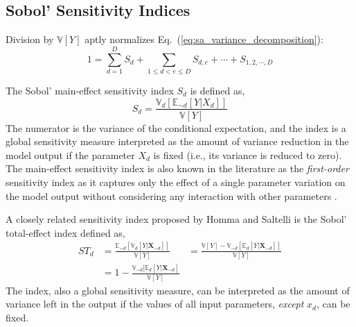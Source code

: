 \subsection{Sobol' Sensitivity Indices}\label{sub:sa_sobol_indices}

Division by $\mathbb{V}[Y]$ aptly normalizes Eq.~(\ref{eq:sa_variance_decomposition}):
\begin{equation}
  1 = \sum_{d = 1}^{D} S_d + \sum_{1 \leq d < e \leq D} S_{d,e} + \cdots + S_{1,2,\cdots,D}
\label{eq:sa_normalized_variance}
\end{equation}

The Sobol' main-effect sensitivity index $S_d$ is defined as,
\begin{equation}
  S_d = \frac{\mathbb{V}_d [\mathbb{E}_{\sim d} [Y|X_d]]}{\mathbb{V}[Y]}
\label{eq:sa_main_effect_index}
\end{equation}
The numerator is the variance of the conditional expectation,
and the index is a global sensitivity measure interpreted as the amount of variance reduction in the model output if the parameter $X_d$ is fixed (i.e., its variance is reduced to zero).
The main-effect sensitivity index is also known in the literature as the \emph{first-order} sensitivity index 
as it captures only the effect of a single parameter variation on the model output without considering any interaction with other parameters \cite{Saltelli2002}.

A closely related sensitivity index proposed by Homma and Saltelli \cite{Homma1996} is the Sobol' total-effect index defined as,
\begin{equation}
  \begin{split}
    ST_{d} & = \frac{\mathbb{E}_{\sim d}[\mathbb{V}_{d}[Y|\mathbf{X}_{\sim d}]]}{\mathbb{V}[Y]}
           & = \frac{\mathbb{V}[Y] - \mathbb{V}_{\sim d}\left[\mathbb{E}_{d}\left[Y|\mathbf{X}_{\sim d}\right]\right]}{\mathbb{V}[Y]} \\
           & = 1 - \frac{\mathbb{V}_{\sim d}[\mathbb{E}_{d}[Y|\mathbf{X}_{\sim d}]}{\mathbb{V}[Y]}
  \end{split}
\label{eq:sa_total_effect_index}
\end{equation}
The index, also a global sensitivity measure, can be interpreted as the amount of variance left in the output if the values of all input parameters, 
\emph{except} $x_d$, can be fixed.

